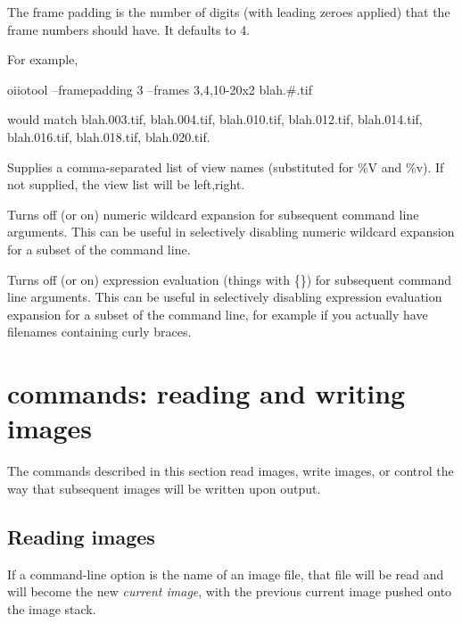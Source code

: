 The frame padding is the number of digits (with leading zeroes applied)
that the frame numbers should have.  It defaults to 4.

For example,
\begin{code}
    oiiotool --framepadding 3 --frames 3,4,10-20x2 blah.#.tif
\end{code}
\noindent would match {\cf blah.003.tif}, {\cf blah.004.tif},
{\cf blah.010.tif}, {\cf blah.012.tif}, 
{\cf blah.014.tif}, {\cf blah.016.tif}, {\cf blah.018.tif}, 
{\cf blah.020.tif}.
\apiend

Supplies a comma-separated list of view names (substituted for {\cf \%V}
and {\cf \%v}). If not supplied, the view list will be {\cf left,right}.
\apiend

Turns off (or on) numeric wildcard expansion for subsequent command
line arguments. This can be useful in selectively disabling numeric wildcard
expansion for a subset of the command line.
\apiend

\NEW %
Turns off (or on) expression evaluation (things with {\cf \{\}})  for
subsequent command line arguments. This can be useful in selectively
disabling expression evaluation expansion for a subset of the command line,
for example if you actually have filenames containing curly braces.
\apiend



\section{\oiiotool commands: reading and writing images}

The commands described in this section read images, write images,
or control the way that subsequent images will be written upon output.

\subsection*{Reading images}

\label{sec:oiiotool:i}
If a command-line option is the name of an image file, that file will
be read and will become the new \emph{current image}, with the previous
current image pushed onto the image stack.


